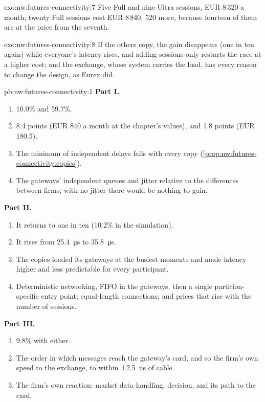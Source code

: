\begin{solution}{exo:nw:futures-connectivity:7}
Five Full and nine Ultra sessions, EUR 8\,320 a month; twenty Full sessions cost EUR 8\,840, 520 more, because fourteen of them
are at the price from the seventh.
\end{solution}

\begin{solution}{exo:nw:futures-connectivity:8}
If the others copy, the gain disappears (one in ten again) while everyone's latency rises, and adding sessions only restarts the
race at a higher cost; and the exchange, whose system carries the load, has every reason to change the design, as Eurex did.
\end{solution}

\begin{solution}{pb:nw:futures-connectivity:1}
\textbf{Part I.}
\begin{enumerate}
\item 10.0\% and 59.7\%.
\item 8.4 points (EUR 840 a month at the chapter's values), and 1.8 points (EUR 180.5).
\item The minimum of independent delays falls with every copy (\cref{prop:nw:futures-connectivity:copies}).
\item The gateways' independent queues and jitter relative to the differences between firms; with no jitter there would be nothing
  to gain.
\end{enumerate}
\textbf{Part II.}
\begin{enumerate}[resume]
\item It returns to one in ten (10.2\% in the simulation).
\item It rises from \qty{25.4}{\micro\second} to \qty{35.8}{\micro\second}.
\item The copies loaded its gateways at the busiest moments and made latency higher and less predictable for every participant.
\item Deterministic networking, FIFO in the gateways, then a single partition-specific entry point; equal-length connections; and
  prices that rise with the number of sessions.
\end{enumerate}
\textbf{Part III.}
\begin{enumerate}[resume]
\item 9.8\% with either.
\item The order in which messages reach the gateway's card, and so the firm's own speed to the exchange, to within ±2.5~ns of cable.
\item The firm's own reaction: market data handling, decision, and its path to the card.

\end{enumerate}
\end{solution}
